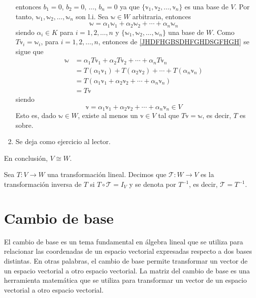\begin{theorem}
\begin{enumerate}[label=\roman*)]
        entonces $b_1 = 0$, $b_2 = 0$, $\dots$, $b_n = 0$ ya que $\{ \mathbb{v}_1,  \mathbb{v}_2,  \dots,  \mathbb{v}_n \}$ es una base de $V$. Por tanto, $\mathbb{w}_1,  \mathbb{w}_2,  \dots,  \mathbb{w}_n$ son l.i. Sea $\mathbb{w} \in W$ arbitraria, entonces
        \begin{equation}
            \mathbb{w} = \alpha_1 \mathbb{w}_1 + \alpha_2 \mathbb{w}_2 + \cdots + \alpha_n \mathbb{w}_n \label{JHDFHGBSDHFGHDSGFHGH}
        \end{equation}
        siendo $\alpha_i \in K$ para $i = 1,  2,  \dots,  n$ y $\{ \mathbb{w}_1,  \mathbb{w}_2,  \dots, \mathbb{w}_n \}$ una base de $W$. Como $T\mathbb{v}_i = \mathbb{w}_i$, para $i = 1,  2,  \dots,  n$, entonces de \eqref{JHDFHGBSDHFGHDSGFHGH} se sigue que
        \begin{align*}
            \mathbb{w} & = \alpha_1T\mathbb{v}_1 + \alpha_2T\mathbb{v}_2 + \cdots + \alpha_nT\mathbb{v}_n \\
            & = T(\alpha_1\mathbb{v}_1) + T(\alpha_2\mathbb{v}_2) + \cdots + T(\alpha_n\mathbb{v}_n) \\
            & = T(\alpha_1\mathbb{v}_1 + \alpha_2\mathbb{v}_2 + \cdots + \alpha_n\mathbb{v}_n) \\
            & = T\mathbb{v}
        \end{align*}
        siendo
        $$\mathbb{v} = \alpha_1\mathbb{v}_1 + \alpha_2\mathbb{v}_2 + \cdots + \alpha_n\mathbb{v}_n \in V$$
        Esto es, dado $\mathbb{w} \in W$, existe al menos un $\mathbb{v} \in V$ tal que $T\mathbb{v} = \mathbb{w}$, es decir, $T$ es sobre.
        \item Se deja como ejercicio al lector.
    \end{enumerate}
    En conclusión, $V \cong W$.
\end{theorem}

\begin{definition}
    Sea $T:V \longrightarrow W$ una transformación lineal. Decimos que $\mathcal{T}:W \longrightarrow V$ es la transformación inversa de $T$ si $T \circ \mathcal{T} = I_V$ y se denota por $T^{-1}$, es decir, $\mathcal{T} = T^{-1}$.
\end{definition}

\newpage

\section{Cambio de base}

El cambio de base es un tema fundamental en álgebra lineal que se utiliza para relacionar las coordenadas de un espacio vectorial expresadas respecto a dos bases distintas. En otras palabras, el cambio de base permite transformar un vector de un espacio vectorial a otro espacio vectorial. La matriz del cambio de base es una herramienta matemática que se utiliza para transformar un vector de un espacio vectorial a otro espacio vectorial.

